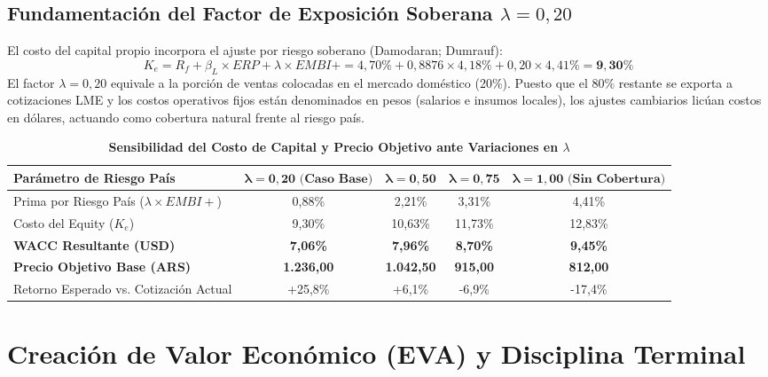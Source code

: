 \documentclass[10pt,a4paper]{article}
\begin{document}
\subsection{Fundamentación del Factor de Exposición Soberana \texorpdfstring{$\lambda = 0,20$}{lambda = 0,20}}
El costo del capital propio incorpora el ajuste por riesgo soberano (Damodaran; Dumrauf):
\begin{equation}
    K_e = R_f + \beta_L \times ERP + \lambda \times EMBI+ = 4,70\% + 0,8876 \times 4,18\% + 0,20 \times 4,41\% = \mathbf{9,30\%}
\end{equation}
El factor $\lambda = 0,20$ equivale a la porción de ventas colocadas en el mercado doméstico (20\%). Puesto que el 80\% restante se exporta a cotizaciones LME y los costos operativos fijos están denominados en pesos (salarios e insumos locales), los ajustes cambiarios licúan costos en dólares, actuando como cobertura natural frente al riesgo país.

\begin{table}[H]
\centering
\caption{\textbf{Sensibilidad del Costo de Capital y Precio Objetivo ante Variaciones en $\lambda$}}
\small
\begin{tabularx}{\textwidth}{Xcccc}
\toprule
\textbf{Parámetro de Riesgo País} & $\mathbf{\lambda = 0,20\text{ (Caso Base)}}$ & $\mathbf{\lambda = 0,50}$ & $\mathbf{\lambda = 0,75}$ & $\mathbf{\lambda = 1,00\text{ (Sin Cobertura)}}$ \\
\midrule
Prima por Riesgo País ($\lambda \times EMBI+$) & 0,88\% & 2,21\% & 3,31\% & 4,41\% \\
Costo del Equity ($K_e$) & 9,30\% & 10,63\% & 11,73\% & 12,83\% \\
\textbf{WACC Resultante (USD)} & \textbf{7,06\%} & \textbf{7,96\%} & \textbf{8,70\%} & \textbf{9,45\%} \\
\textbf{Precio Objetivo Base (ARS)} & \textbf{1.236,00} & \textbf{1.042,50} & \textbf{915,00} & \textbf{812,00} \\
Retorno Esperado vs. Cotización Actual & +25,8\% & +6,1\% & -6,9\% & -17,4\% \\
\bottomrule
\end{tabularx}
\end{table}

\section{Creación de Valor Económico (EVA) y Disciplina Terminal}
\end{document}
